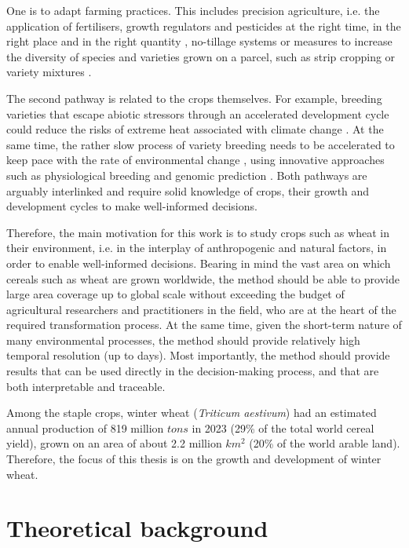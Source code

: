 One is to adapt farming practices. This includes precision agriculture, i.e. the application of fertilisers, growth regulators and pesticides at the right time, in the right place and in the right quantity \citep{finger_precision_2019}, no-tillage systems \citep{triplett_notillage_2008} or measures to increase the diversity of species and varieties grown on a parcel, such as strip cropping \citep{juventia_spatio-temporal_2022} or variety mixtures \citep{tschurr_mixing_2023}.

The second pathway is related to the crops themselves. For example, breeding varieties that escape abiotic stressors through an accelerated development cycle could reduce the risks of extreme heat associated with climate change \citep{rezaei_climate_2018, rogger_can_2021}. At the same time, the rather slow process of variety breeding needs to be accelerated to keep pace with the rate of environmental change \citep{zhang_climate_2022}, using innovative approaches such as physiological breeding \citep{reynolds_physiological_2016} and genomic prediction \citep{desta_genomic_2014}. Both pathways are arguably interlinked and require solid knowledge of crops, their growth and development cycles to make well-informed decisions.

Therefore, the main motivation for this work is to study crops such as wheat in their environment, i.e. in the interplay of anthropogenic and natural factors, in order to enable well-informed decisions. Bearing in mind the vast area on which cereals such as wheat are grown worldwide, the method should be able to provide large area coverage up to global scale without exceeding the budget of agricultural researchers and practitioners in the field, who are at the heart of the required transformation process. At the same time, given the short-term nature of many environmental processes, the method should provide relatively high temporal resolution (up to days). Most importantly, the method should provide results that can be used directly in the decision-making process, and that are both interpretable and traceable. 

Among the staple crops, winter wheat (\textsl{Triticum aestivum}) had an estimated annual production of 819 million $tons$ in 2023 (29\% of the total world cereal yield), grown on an area of about 2.2 million $km^2$ (20\% of the world arable land). Therefore, the focus of this thesis is on the growth and development of winter wheat.

\section{Theoretical background}

